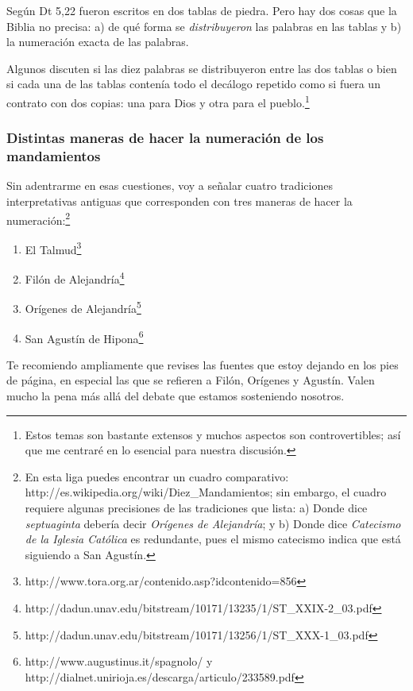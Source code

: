 \documentclass{article}
\begin{document}
Seg\'un Dt 5,22 fueron escritos en dos tablas de piedra. Pero hay dos cosas que la Biblia no precisa: a) de qu\'e forma se \emph{distribuyeron} las palabras en las tablas y b) la numeraci\'on exacta de las palabras.

Algunos discuten si las diez palabras se distribuyeron entre las dos tablas o bien si cada una de las tablas conten\'{i}a todo el dec\'alogo repetido como si fuera un contrato con dos copias: una para Dios y otra para el pueblo.\footnote{Estos temas son bastante extensos y muchos aspectos son controvertibles; as\'{i} que me centrar\'e en lo esencial para nuestra discusi\'on.}

\subsubsection{Distintas maneras de hacer la numeraci\'on de los mandamientos}

Sin adentrarme en esas cuestiones, voy a se\~nalar cuatro tradiciones interpretativas antiguas que corresponden con tres maneras de hacer la numeraci\'on:\footnote{En esta liga puedes encontrar un cuadro comparativo: http://es.wikipedia.org/wiki/Diez\_Mandamientos; sin embargo, el cuadro requiere algunas precisiones de las tradiciones que lista: a) Donde dice \emph{septuaginta} deber\'{i}a decir \emph{Or\'{i}genes de Alejandr\'{i}a}; y b) Donde dice \emph{Catecismo de la Iglesia Cat\'olica} es redundante, pues el mismo catecismo indica que est\'a siguiendo a San Agust\'{i}n.}

\begin{enumerate}
\item El Talmud\footnote{http://www.tora.org.ar/contenido.asp?idcontenido=856}
\item Fil\'on de Alejandr\'{i}a\footnote{http://dadun.unav.edu/bitstream/10171/13235/1/ST\_XXIX-2\_03.pdf}
\item Or\'{i}genes de Alejandr\'{i}a\footnote{http://dadun.unav.edu/bitstream/10171/13256/1/ST\_XXX-1\_03.pdf}
\item San Agust\'{i}n de Hipona\footnote{http://www.augustinus.it/spagnolo/ y http://dialnet.unirioja.es/descarga/articulo/233589.pdf}
\end{enumerate}

\noindent
Te recomiendo ampliamente que revises las fuentes que estoy dejando en los pies de p\'agina, en especial las que se refieren a Fil\'on, Or\'{i}genes y Agust\'{i}n. Valen mucho la pena m\'as all\'a del debate que estamos sosteniendo nosotros.
\end{document}
